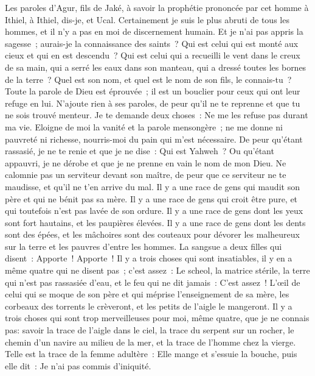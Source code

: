 \begin{multicols}{2}
\VerseOne{}Les paroles d'Agur, fils de Jaké, à savoir la prophétie prononcée par cet homme à Ithiel, à Ithiel, dis-je, et Ucal.
Certainement je suis le plus abruti de tous les hommes, et il n'y a pas en moi de discernement humain.
Et je n'ai pas appris la sagesse~; aurais-je la connaissance des saints~?
Qui est celui qui est monté aux cieux et qui en est descendu~? Qui est celui qui a recueilli le vent dans le creux de sa main, qui a serré les eaux dans son manteau, qui a dressé toutes les bornes de la terre~? Quel est son nom, et quel est le nom de son fils, le connais-tu~?
Toute la parole de Dieu est éprouvée~; il est un bouclier pour ceux qui ont leur refuge en lui.
N'ajoute rien à ses paroles, de peur qu'il ne te reprenne et que tu ne sois trouvé menteur.
Je te demande deux choses~: Ne me les refuse pas durant ma vie.
Eloigne de moi la vanité et la parole mensongère~; ne me donne ni pauvreté ni richesse, nourris-moi du pain qui m'est nécessaire.
De peur qu'étant rassasié, je ne te renie et que je ne dise~: Qui est Yahweh~? Ou qu'étant appauvri, je ne dérobe et que je ne prenne en vain le nom de mon Dieu.
Ne calomnie pas un serviteur devant son maître, de peur que ce serviteur ne te maudisse, et qu'il ne t'en arrive du mal.
Il y a une race de gens qui maudit son père et qui ne bénit pas sa mère.
Il y a une race de gens qui croit être pure, et qui toutefois n'est pas lavée de son ordure.
Il y a une race de gens dont les yeux sont fort hautains, et les paupières élevées.
Il y a une race de gens dont les dents sont des épées, et les mâchoires sont des couteaux pour dévorer les malheureux sur la terre et les pauvres d'entre les hommes.
La sangsue a deux filles qui disent~: Apporte~! Apporte~! Il y a trois choses qui sont insatiables, il y en a même quatre qui ne disent pas~; c'est assez~:
Le scheol, la matrice stérile, la terre qui n'est pas rassasiée d'eau, et le feu qui ne dit jamais~: C'est assez~!
L'œil de celui qui se moque de son père et qui méprise l'enseignement de sa mère, les corbeaux des torrents le crèveront, et les petits de l'aigle le mangeront.
Il y a trois choses qui sont trop merveilleuses pour moi, même quatre, que je ne connais pas:
savoir la trace de l'aigle dans le ciel, la trace du serpent sur un rocher, le chemin d'un navire au milieu de la mer, et la trace de l'homme chez la vierge.
Telle est la trace de la femme adultère~: Elle mange et s'essuie la bouche, puis elle dit~: Je n'ai pas commis d'iniquité.

\end{multicols}

